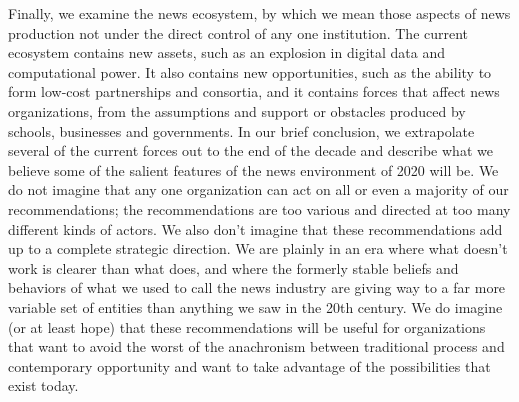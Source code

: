 Finally, we examine the news ecosystem, by which we mean those aspects of
news production not under the direct control of any one institution. The current
ecosystem contains new assets, such as an explosion in digital data and computational
power. It also contains new opportunities, such as the ability to form
low-cost partnerships and consortia, and it contains forces that affect news organizations,
from the assumptions and support or obstacles produced by schools,
businesses and governments.
In our brief conclusion, we extrapolate several of the current forces out to the
end of the decade and describe what we believe some of the salient features of
the news environment of 2020 will be.
We do not imagine that any one organization can act on all or even a majority
of our recommendations; the recommendations are too various and directed at
too many different kinds of actors. We also don’t imagine that these recommendations
add up to a complete strategic direction. We are plainly in an era where
what doesn’t work is clearer than what does, and where the formerly stable
beliefs and behaviors of what we used to call the news industry are giving way
to a far more variable set of entities than anything we saw in the 20th century.
We do imagine (or at least hope) that these recommendations will be useful for
organizations that want to avoid the worst of the anachronism between traditional
process and contemporary opportunity and want to take advantage of the
possibilities that exist today.

